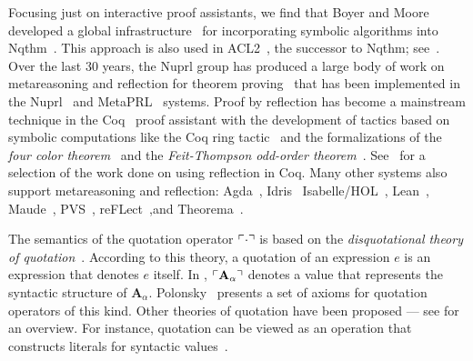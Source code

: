 \documentclass[fleqn]{llncs}
\begin{document}
Focusing just on interactive proof assistants, we find
that Boyer and Moore developed a global
infrastructure~\cite{BoyerMoore81} for
incorporating symbolic algorithms into Nqthm~\cite{BoyerMoore88}.
This approach is also used in
ACL2~\cite{KaufmannMoore97}, the successor to Nqthm;
see~\cite{HuntEtAl05}.  Over the last 30 years, the Nuprl group
has produced a large body of work on metareasoning
and reflection for theorem
proving~\cite{AllenEtAl90,Barzilay05,Constable95,Howe92,KnoblockConstable86,Nogin05,Yu07}
that has been implemented in the Nuprl~\cite{Constable86} and
MetaPRL~\cite{HickeyEtAl03} systems.  Proof by reflection has become a
mainstream technique in the Coq~\cite{Coq8.5} proof assistant with the
development of tactics based on symbolic computations like the Coq
ring tactic~\cite{Boutin97,GregoireMahboubi05} and the formalizations
of the \emph{four color theorem}~\cite{Gonthier08} and the
\emph{Feit-Thompson odd-order theorem}~\cite{GonthierEtAl13}.
See~\cite{Boutin97,BraibantPous11,Chlipala13,gonthier2010introduction,GregoireMahboubi05,JamesHinze09,OostdijkGeuvers02}
for a selection of the work done on using reflection in Coq.
Many other systems also support metareasoning and reflection:
Agda~\cite{Norell09,VanDerWalt12,VanDerWaltSwierstra12},
Idris~\cite{Christiansen:2014,Christiansen:2016,Christiansen:2016:Thesis}
Isabelle/HOL~\cite{ChaiebNipkow08},
Lean~\cite{ebner2017metaprogramming},
Maude~\cite{ClavelMeseguer02}, 
PVS~\cite{VonHenkeEtAl98}, 
reFLect~\cite{GrundyEtAl06,MelhamEtAl13},and
Theorema~\cite{GieseBuchberger07,BuchbergerEtAl06}.

The semantics of the quotation operator $\ulcorner\cdot\urcorner$ is based on
the \emph{disquotational theory of quotation}~\cite{Quotation12}.
According to this theory, a quotation of an expression $e$ is an
expression that denotes $e$ itself.  In {\churchqe},
$\ulcorner\textbf{A}_\alpha\urcorner$ denotes a value that represents the
syntactic structure of $\textbf{A}_\alpha$.  Polonsky~\cite{Polonsky11} 
presents a set of axioms for quotation operators of this
kind.  Other theories of quotation have been proposed --- see
\cite{Quotation12} for an overview.  For instance, quotation can be viewed as
an operation that constructs literals for syntactic values~\cite{Rabe15}.
\end{document}
